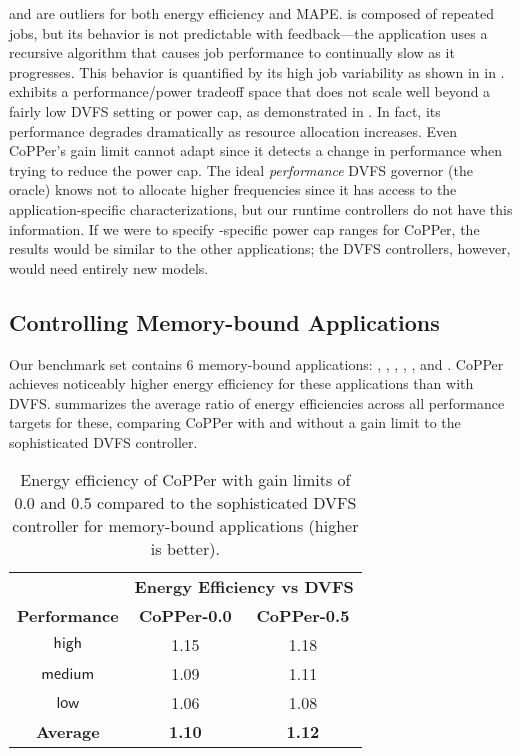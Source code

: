  and  are outliers for both energy efficiency and MAPE.
 is composed of repeated jobs, but its behavior is not predictable with feedback---the application uses a recursive algorithm that causes job performance to continually slow as it progresses.
This behavior is quantified by its high job variability as shown in  in .
 exhibits a performance/power tradeoff space that does not scale well beyond a fairly low DVFS setting or power cap, as demonstrated in .
In fact, its performance degrades dramatically as resource allocation increases.
Even CoPPer's gain limit cannot adapt since it detects a change in performance when trying to reduce the power cap.
The ideal \emph{performance} DVFS governor (the oracle) knows not to allocate higher frequencies since it has access to the application-specific characterizations, but our runtime controllers do not have this information.
If we were to specify -specific power cap ranges for CoPPer, the results would be similar to the other applications; the DVFS controllers, however, would need entirely new models.


\subsection{Controlling Memory-bound Applications}

Our benchmark set contains 6 memory-bound applications: , , , , , and .
CoPPer achieves noticeably higher energy efficiency for these applications than with DVFS.
 summarizes the average ratio of energy efficiencies across all performance targets for these, comparing CoPPer with and without a gain limit to the sophisticated DVFS controller.

\begin{table}[t]
\small
\centering
\caption{Energy efficiency of CoPPer with gain limits of 0.0 and 0.5 compared to the sophisticated DVFS controller for memory-bound applications (higher is better).}
\begin{tabular}{ccc}
  &\multicolumn{2}{c}{\textbf{Energy Efficiency vs DVFS}} \\
  \textbf{Performance} & \textbf{CoPPer-0.0} & \textbf{CoPPer-0.5} \\
  \hline
  \hline
    $\mathsf{high}$  & 1.15  & 1.18 \\
   $\mathsf{medium}$   & 1.09  & 1.11 \\
   $\mathsf{low}$   & 1.06  & 1.08 \\
  \textbf{Average}& \textbf{1.10}  & \textbf{1.12} \\
  \hline
  \hline
\end{tabular}
\label{tbl:copper-mem}
\end{table}

